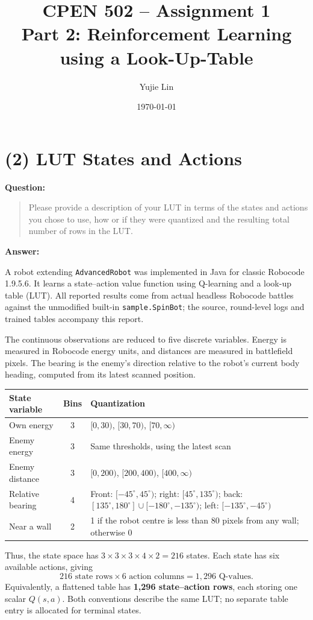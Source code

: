 \documentclass[11pt,letterpaper]{article}
\title{CPEN 502 -- Assignment 1\\Part 2: Reinforcement Learning using a Look-Up-Table}
\author{Yujie Lin}
\date{\today}
\newcommand{\question}[1]{\noindent\textbf{Question:}\begin{quote}#1\end{quote}\noindent\textbf{Answer:}\par}
\begin{document}
\maketitle
\section*{(2) LUT States and Actions}
\question{Please provide a description of your LUT in terms of the states and actions you chose to use, how or if they were quantized and the resulting total number of rows in the LUT.}
A robot extending \texttt{AdvancedRobot} was implemented in Java for classic Robocode 1.9.5.6. It learns a state--action value function using Q-learning and a look-up table (LUT). All reported results come from actual headless Robocode battles against the unmodified built-in \texttt{sample.SpinBot}; the source, round-level logs and trained tables accompany this report.

The continuous observations are reduced to five discrete variables. Energy is measured in Robocode energy units, and distances are measured in battlefield pixels. The bearing is the enemy's direction relative to the robot's current body heading, computed from its latest scanned position.
\begin{center}\small
\begin{tabular}{p{1.12in}cp{3.65in}}
\toprule
State variable & Bins & Quantization \\\midrule
Own energy & 3 & $[0,30)$, $[30,70)$, $[70,\infty)$ \\
Enemy energy & 3 & Same thresholds, using the latest scan \\
Enemy distance & 3 & $[0,200)$, $[200,400)$, $[400,\infty)$ \\
Relative bearing & 4 & Front: $[-45^\circ,45^\circ)$; right: $[45^\circ,135^\circ)$; back: $[135^\circ,180^\circ]\cup[-180^\circ,-135^\circ)$; left: $[-135^\circ,-45^\circ)$ \\
Near a wall & 2 & 1 if the robot centre is less than 80 pixels from any wall; otherwise 0 \\
\bottomrule
\end{tabular}
\end{center}
Thus, the state space has $3\times3\times3\times4\times2=216$ states. Each state has six available actions, giving
\[
\boxed{216\text{ state rows}\times6\text{ action columns}=1,296\text{ Q-values}.}
\]
Equivalently, a flattened table has \textbf{1,296 state--action rows}, each storing one scalar $Q(s,a)$. Both conventions describe the same LUT; no separate table entry is allocated for terminal states.
\end{document}
